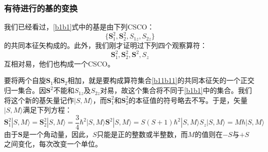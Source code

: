 \documentclass[]{article}
\begin{document}
\subsubsection{有待进行的基的变换}
我们已经看过，\eqref{b1b1}式中的基是由下列CSCO：
\begin{equation}
	\{\boldsymbol{S}^2_1,\boldsymbol{S}^2_2,S_{1z},S_{2z}\}
\end{equation}
的共同本征矢构成的。此外，我们刚才证明过下列四个观察算符：
\begin{equation}
	\boldsymbol{S}^2_1,\boldsymbol{S}^2_2,\boldsymbol{S}^2,S_z
	\label{b11b11}
\end{equation}
互相对易，他们也构成一个CSCO。\par 
要将两个自旋$\boldsymbol{S}_1$和$\boldsymbol{S}_2$相加，就是要构成算符集合\eqref{b11b11}的共同本征矢的一个正交归一集合。因$\boldsymbol{S}^2$不能和$S_{1z}$及$S_{2z}$对易，故这个集合将不同于\eqref{b1b1}中的集合。我们将这个新的基矢量记作$|S,M\rangle$，而$\boldsymbol{S}^2_1$和$\boldsymbol{S}^2_2$的本征值的符号略去不写。于是，矢量$|S,M\rangle$满足下列方程：
\begin{subequations}
	\begin{equation}
		\boldsymbol{S}^2_1|S,M\rangle=\boldsymbol{S}^2_2|S,M\rangle=\dfrac{3}{4}\hbar^2|S,M\rangle
		\label{b12ab12a}
	\end{equation}
	\begin{equation}
		\boldsymbol{S}^2|S,M\rangle=S(S+1)\hbar^2|S,M\rangle
	\end{equation}
	\begin{equation}
		S_z|S,M\rangle=M\hbar|S,M\rangle
	\end{equation}
\end{subequations}
由于$\boldsymbol{S}$是一个角动量，因此，$S$只能是正的整数或半整数，而$M$的值则在$-S$与$+S$之间变化，每次改变一个单位。
\end{document}
